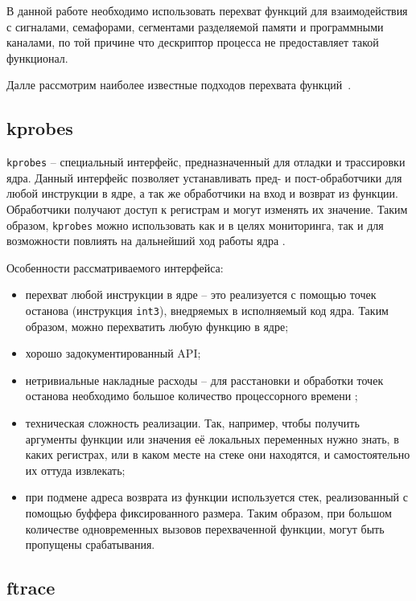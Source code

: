 В данной работе необходимо использовать перехват функций для взаимодействия с сигналами, семафорами, сегментами разделяемой памяти и программными каналами, по той причине что дескриптор процесса не предоставляет такой функционал.

Далле рассмотрим наиболее известные подходов перехвата функций~\cite{}.

\subsection{kprobes}

\texttt{kprobes} \cite{kprobes} -- специальный интерфейс, предназначенный для отладки и трассировки ядра. Данный интерфейс позволяет устанавливать пред- и пост-обработчики для любой инструкции в ядре, а так же обработчики на вход и возврат из функции. Обработчики получают доступ к регистрам и могут изменять их значение. Таким образом, \texttt{kprobes} можно использовать как и в целях мониторинга, так и для возможности повлиять на дальнейший ход работы ядра \cite{habr-profiling-linux}.

Особенности рассматриваемого интерфейса:

\begin{itemize}
	\item перехват любой инструкции в ядре -- это реализуется с помощью точек останова (инструкция \texttt{int3}), внедряемых в исполняемый код ядра. Таким образом, можно перехватить любую функцию в ядре;
	\item хорошо задокументированный API;
	\item нетривиальные накладные расходы -- для расстановки и обработки точек останова необходимо большое количество процессорного времени \cite{habr-profiling-linux};
	\item техническая сложность реализации. Так, например, чтобы получить аргументы функции или значения её локальных переменных нужно знать, в каких регистрах, или в каком месте на стеке они находятся, и самостоятельно их оттуда извлекать;
	\item при подмене адреса возврата из функции используется стек, реализованный с помощью буффера фиксированного размера. Таким образом, при большом количестве одновременных вызовов перехваченной функции, могут быть пропущены срабатывания.
\end{itemize}

\subsection{ftrace}

